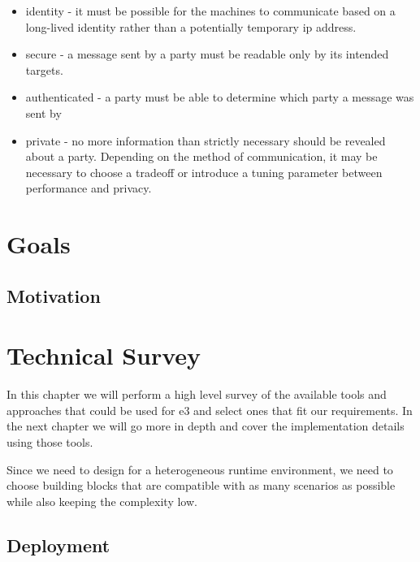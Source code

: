 \begin{itemize}
  \begin{itemize}
  \tightlist
  \item
    identity - it must be possible for the machines to communicate based
    on a long-lived identity rather than a potentially temporary
    \gls{ip} address.
  \item
    secure - a message sent by a party must be readable only by its
    intended targets.
  \item
    authenticated - a party must be able to determine which party a
    message was sent by
  \item
    private - no more information than strictly necessary should be
    revealed about a party. Depending on the method of communication, it
    may be necessary to choose a tradeoff or introduce a tuning
    parameter between performance and privacy.
  \end{itemize}
\end{itemize}

\hypertarget{goals}{%
\chapter{Goals}\label{goals}}

\hypertarget{motivation}{%
\section{Motivation}\label{motivation}}

\hypertarget{technical-survey}{%
\chapter{Technical Survey}\label{technical-survey}}

In this chapter we will perform a high level survey of the available
tools and approaches that could be used for \gls{e3} and select ones
that fit our requirements. In the next chapter we will go more in depth
and cover the implementation details using those tools.

Since we need to design for a heterogeneous runtime environment, we need
to choose building blocks that are compatible with as many scenarios as
possible while also keeping the complexity low.

\hypertarget{deployment}{%
\section{Deployment}\label{deployment}}

